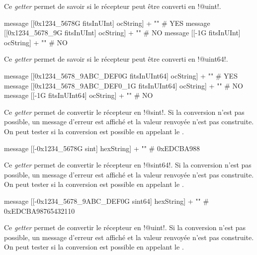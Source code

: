 
Ce \emph{getter} permet de savoir si le récepteur peut être converti en \ggs!@uint!.

\begin{galgas}
message [[0x1234_5678G fitsInUInt] ocString] + "\n" # YES
message [[0x1234_5678_9G fitsInUInt] ocString] + "\n" # NO
message [[-1G fitsInUInt] ocString] + "\n" # NO
\end{galgas}







Ce \emph{getter} permet de savoir si le récepteur peut être converti en \ggs!@uint64!.

\begin{galgas}
message [[0x1234_5678_9ABC_DEF0G fitsInUInt64] ocString] + "\n" # YES
message [[0x1234_5678_9ABC_DEF0_1G fitsInUInt64] ocString] + "\n" # NO
message [[-1G fitsInUInt64] ocString] + "\n" # NO
\end{galgas}



Ce \emph{getter} permet de convertir le récepteur en \ggs!@sint!. Si la conversion n'est pas possible, un message d'erreur est affiché et la valeur renvoyée n'est pas construite. On peut tester si la conversion est possible en appelant le .

\begin{galgas}
message [[-0x1234_5678G sint] hexString] + "\n" # 0xEDCBA988
\end{galgas}





Ce \emph{getter} permet de convertir le récepteur en \ggs!@sint64!. Si la conversion n'est pas possible, un message d'erreur est affiché et la valeur renvoyée n'est pas construite. On peut tester si la conversion est possible en appelant le .

\begin{galgas}
message [[-0x1234_5678_9ABC_DEF0G sint64] hexString] + "\n" # 0xEDCBA98765432110
\end{galgas}



Ce \emph{getter} permet de convertir le récepteur en \ggs!@uint!. Si la conversion n'est pas possible, un message d'erreur est affiché et la valeur renvoyée n'est pas construite. On peut tester si la conversion est possible en appelant le .

